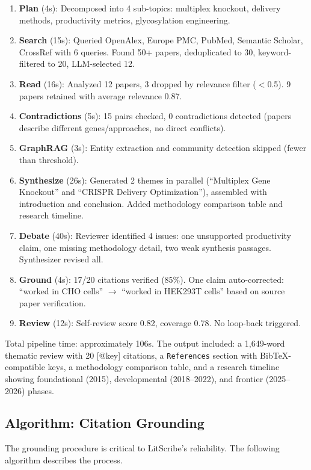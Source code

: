 \documentclass[11pt]{article}
\begin{document}
\begin{enumerate}[nosep]
    \item \textbf{Plan} (4s): Decomposed into 4 sub-topics: multiplex knockout, delivery methods, productivity metrics, glycosylation engineering.
    \item \textbf{Search} (15s): Queried OpenAlex, Europe PMC, PubMed, Semantic Scholar, CrossRef with 6 queries. Found 50+ papers, deduplicated to 30, keyword-filtered to 20, LLM-selected 12.
    \item \textbf{Read} (16s): Analyzed 12 papers, 3 dropped by relevance filter ($<$0.5). 9 papers retained with average relevance 0.87.
    \item \textbf{Contradictions} (5s): 15 pairs checked, 0 contradictions detected (papers describe different genes/approaches, no direct conflicts).
    \item \textbf{GraphRAG} (3s): Entity extraction and community detection skipped (fewer than threshold).
    \item \textbf{Synthesize} (26s): Generated 2 themes in parallel (``Multiplex Gene Knockout'' and ``CRISPR Delivery Optimization''), assembled with introduction and conclusion. Added methodology comparison table and research timeline.
    \item \textbf{Debate} (40s): Reviewer identified 4 issues: one unsupported productivity claim, one missing methodology detail, two weak synthesis passages. Synthesizer revised all.
    \item \textbf{Ground} (4s): 17/20 citations verified (85\%). One claim auto-corrected: ``worked in CHO cells'' $\rightarrow$ ``worked in HEK293T cells'' based on source paper verification.
    \item \textbf{Review} (12s): Self-review score 0.82, coverage 0.78. No loop-back triggered.
\end{enumerate}

Total pipeline time: approximately 106s. The output included: a 1,649-word thematic review with 20 [@key] citations, a \texttt{References} section with BibTeX-compatible keys, a methodology comparison table, and a research timeline showing foundational (2015), developmental (2018--2022), and frontier (2025--2026) phases.

\subsection{Algorithm: Citation Grounding}

The grounding procedure is critical to LitScribe's reliability. The following algorithm describes the process.
\end{document}
